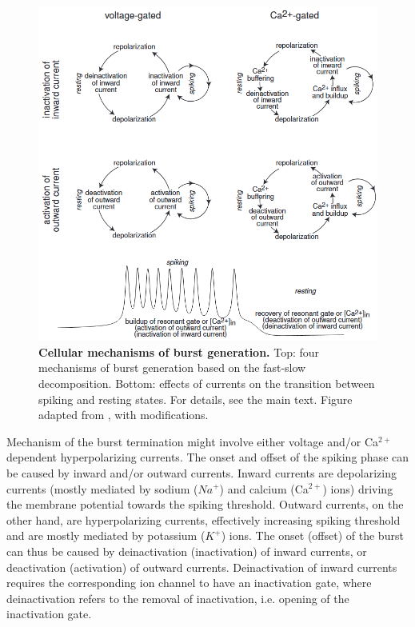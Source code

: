 \documentclass[../main.tex]{subfiles}
\begin{document}
\begin{figure}[!t]
    \centering
    \includegraphics[width=0.85\linewidth]{../img/modeling_r5/examples/bursting_ionic_basis.png}
    \caption[Cellular mechanisms of burst generation]{
        \textbf{Cellular mechanisms of burst generation.}
        Top: four mechanisms of burst generation based on the fast-slow decomposition. Bottom: effects of currents on the transition between spiking and resting states.
        For details, see the main text.
        Figure adapted from \parencite{izhikevichDynamicalSystemsNeuroscience2006}, with modifications.
    }
    \label{fig:ionic_basis_for_slow_fast_bursting}
\end{figure}

Mechanism of the burst termination might involve either voltage and/or Ca$^{2+}$ dependent hyperpolarizing currents.
The onset and offset of the spiking phase can be caused by inward and/or outward currents. Inward currents are depolarizing currents (mostly mediated by sodium ($Na^+$) and calcium (Ca$^{2+}$) ions) driving the membrane potential towards the spiking threshold. Outward currents, on the other hand, are hyperpolarizing currents, effectively increasing spiking threshold and are mostly mediated by potassium ($K^+$) ions.
The onset (offset) of the burst can thus be caused by deinactivation (inactivation) of inward currents, or deactivation (activation) of outward currents. Deinactivation of inward currents requires the corresponding ion channel to have an inactivation gate, where deinactivation refers to the removal of inactivation, i.e. opening of the inactivation gate.
\end{document}
